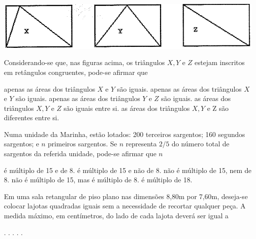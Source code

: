 \begin{question}%

    
    \includegraphics[width=.5\textwidth]{CONCURSO/EAM/IMAGES/2005/EAM200508IMG.png}

Considerando-se que, nas figuras acima, os triângulos \(X,Y\) e \(Z\) estejam inscritos em retângulos congruentes, pode-se afirmar que
    \begin{tasks}
        \task apenas as áreas dos triângulos \(X\) e \(Y\) são iguais.
        \task apenas as áreas dos triângulos \(X\) e \(Y\) são iguais.
        \task apenas as áreas dos triângulos \(Y\) e \(Z\) são iguais.
        \task as áreas dos triângulos \(X,Y\) e \(Z\) são iguais entre si.
        \task as áreas dos triângulos \(X, Y\) e Z são diferentes entre si.
    \end{tasks}
\end{question}

\begin{question}%
Numa unidade da Marinha, estão lotados: 200 terceiros sargentos; 160 segundos sargentos; e \(n\) primeiros sargentos. Se \(n\) representa \(2/5\) do número total de sargentos da referida unidade, pode-se afirmar que \(n\)
    \begin{tasks}
        \task é múltiplo de 15 e de 8.
        \task é múltiplo de 15 e não de 8.
        \task não é múltiplo de 15, nem de 8.
        \task não é múltiplo de 15, mas é múltiplo de 8.
        \task é múltiplo de 18.
    \end{tasks}
\end{question}

\begin{question}%
Em uma sala retangular de piso plano nas dimensões 8,80m por 7,60m, deseja-se colocar lajotas quadradas iguais sem a necessidade de recortar qualquer peça. A medida máximo, em centímetros, do lado de cada lajota deverá ser igual a
    \begin{tasks}
        .
        .
        .
        .
        .
    \end{tasks}
\end{question}

